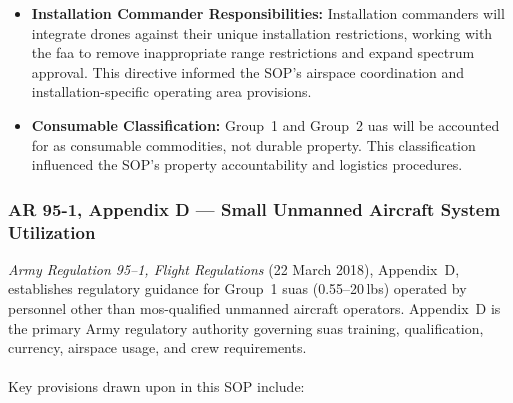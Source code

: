 \begin{itemize}
            \item \textbf{Installation Commander Responsibilities:} Installation commanders will integrate drones against their unique installation restrictions, working with the \ac{faa} to remove inappropriate range restrictions and expand spectrum approval.  This directive informed the SOP's airspace coordination and installation-specific operating area provisions.
            \item \textbf{Consumable Classification:} Group~1 and Group~2 \ac{uas} will be accounted for as consumable commodities, not durable property.  This classification influenced the SOP's property accountability and logistics procedures.
        \end{itemize}

        \subsubsection{AR 95-1, Appendix D --- Small Unmanned Aircraft System Utilization}
        \textit{Army Regulation 95--1, Flight Regulations} (22 March 2018), Appendix~D, establishes regulatory guidance for Group~1 \ac{suas} (0.55--20\,lbs) operated by personnel other than \ac{mos}-qualified unmanned aircraft operators.  Appendix~D is the primary Army regulatory authority governing \ac{suas} training, qualification, currency, airspace usage, and crew requirements.

        \paragraph{} Key provisions drawn upon in this SOP include:


